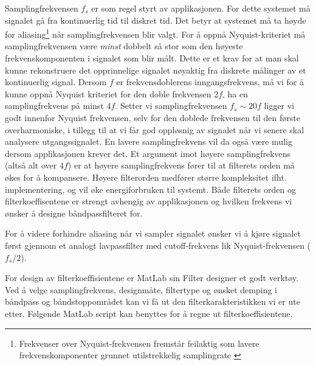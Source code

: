 Samplingfrekvensen $f_s$ er som regel styrt av applikasjonen. For dette systemet må signalet gå fra 
kontinuerlig tid til diskret tid. Det betyr at systemet må ta høyde for aliasing\footnote{Frekvenser over Nyquist-frekvensen fremstår feilaktig som lavere frekvenskomponenter grunnet utilstrekkelig samplingrate \cite{aliasing}} 
når samplingfrekvensen blir valgt.
For å oppnå Nyquist-kriteriet \cite{nyquist} må samplingfrekvensen være \textit{minst} dobbelt så stor som den høyeste
frekvenskomponenten i signalet som blir målt. Dette er et krav for at man skal kunne rekonstruere det opprinnelige signalet 
nøyaktig fra diskrete målinger av et kontinuerlig signal. Dersom $f$ er frekvensdoblerens inngangsfrekvens, må vi for å kunne 
oppnå Nyquist kriteriet for den doble frekvensen $2f$, ha en samplingfrekvens på minst $4f$. Setter vi samplingfrekvensen $f_s \sim 20f$ ligger vi godt innenfor 
Nyquist frekvensen, selv for den doblede frekvensen til den første overharmoniske, 
i tillegg til at vi får god oppløsnig av signalet når vi senere skal analysere utgangssignalet. 
En lavere samplingfrekvens vil da også være mulig dersom applikasjonen krever det. Et argument imot høyere
samplingfrekvens (altså alt over $4f$) er at høyere samplingfrekvens fører til at filterets orden må økes 
for å kompansere. Høyere filterorden medfører større kompleksitet ifht. implementering, og vil øke energiforbruken 
til systemt. Både filterets orden og filterkoeffisentene er strengt avhengig av applikasjonen og hvilken
frekvens vi ønsker å designe båndpassfilteret for. 

For å videre forhindre aliasing når vi sampler signalet ønsker vi å kjøre signalet først gjennom et analogt 
lavpassfilter med cutoff-frekvens lik Nyquist-frekvensen ($f_s/2$).

For design av filterkoeffisientene er MatLab sin Filter designer et godt verktøy. Ved å velge samplingfrekvens, designmåte, filtertype 
og ønsket demping i båndpass og båndstoppområdet kan vi få ut den filterkarakteristikken vi er ute etter. Følgende MatLab script kan benyttes for 
å regne ut filterkoeffisientene.

